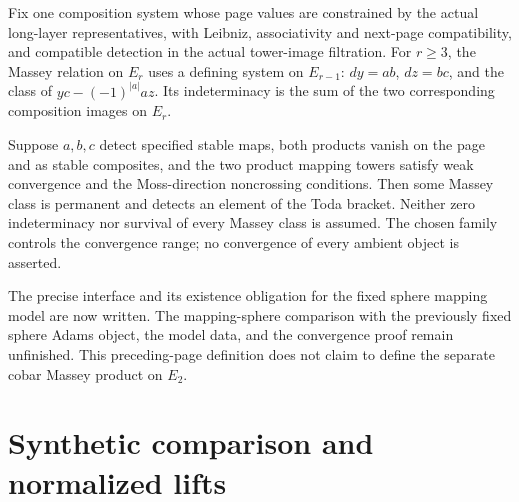 \begin{theorem}
  \label{thm:moss-convergence-adapter}
  \notready
  Fix one composition system whose page values are constrained by the actual
  long-layer representatives, with Leibniz, associativity and next-page
  compatibility, and compatible detection in the actual tower-image filtration.
  For $r\ge3$, the Massey relation on $E_r$ uses a defining system on
  $E_{r-1}$: $dy=ab$, $dz=bc$, and the class of
  $yc-(-1)^{|a|}az$. Its indeterminacy is the sum of the two corresponding
  composition images on $E_r$.

  Suppose $a,b,c$ detect specified stable maps, both products vanish on the
  page and as stable composites, and the two product mapping towers satisfy
  weak convergence and the Moss-direction noncrossing conditions. Then some
  Massey class is permanent and detects an element of the Toda bracket.
  Neither zero indeterminacy nor survival of every Massey class is assumed.
  The chosen family controls the convergence range; no convergence of every
  ambient object is asserted.

  The precise interface and its existence obligation for the fixed sphere
  mapping model are now written. The mapping-sphere comparison with the
  previously fixed sphere Adams object, the model data, and the convergence
  proof remain unfinished. This preceding-page definition does not claim to
  define the separate cobar Massey product on $E_2$.
\end{theorem}

\section{Synthetic comparison and normalized lifts}

